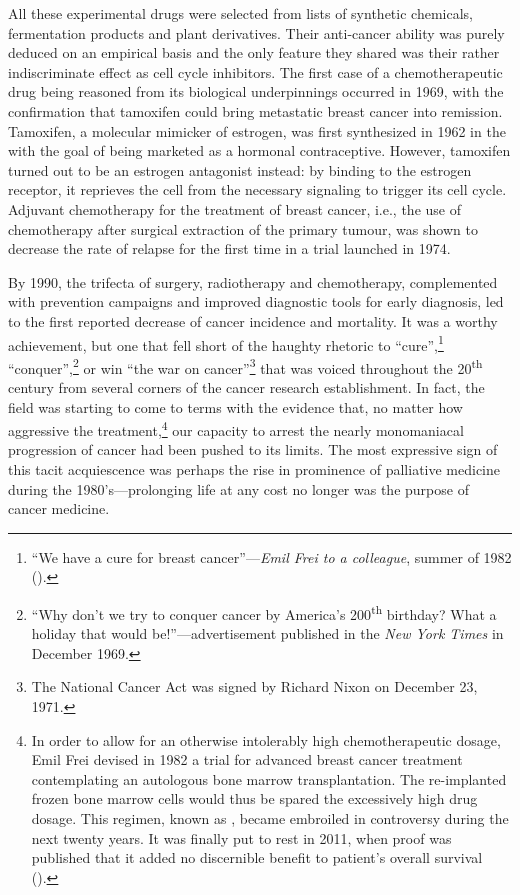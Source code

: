 All these experimental drugs were selected from lists of synthetic chemicals,
fermentation products and plant derivatives.  Their anti-cancer ability was
purely deduced on an empirical basis and the only feature they shared was their
rather indiscriminate effect as cell cycle inhibitors.  The first case of a
chemotherapeutic drug being reasoned from its biological underpinnings occurred
in 1969, with the confirmation that tamoxifen could bring metastatic breast
cancer into remission.\cite{cole_new_1971} Tamoxifen, a molecular mimicker of
estrogen, was first synthesized in 1962 in the  with the goal of
being marketed as a hormonal contraceptive.  However, tamoxifen turned out to be
an estrogen antagonist instead: by binding to the estrogen receptor, it
reprieves the cell from the necessary signaling to trigger its cell
cycle.\cite{jordan_effects_1977} Adjuvant chemotherapy for the treatment of
breast cancer, i.e., the use of chemotherapy after surgical extraction of the
primary tumour, was shown to decrease the rate of relapse for the first time in
a trial launched in 1974.\cite{bonadonna_combination_1976}

By 1990, the trifecta of surgery, radiotherapy and chemotherapy, complemented
with prevention campaigns and improved diagnostic tools for early diagnosis, led
to the first reported decrease of cancer incidence and
mortality.\cite{devita_two_2012} It was a worthy achievement, but one that fell
short of the haughty rhetoric to ``cure'',\footnote{``We have a cure for breast
  cancer''---\emph{Emil Frei to a colleague}, summer of 1982
  (\citealp{mukherjee_emperor_2011}).} ``conquer'',\footnote{``Why don't we try
  to conquer cancer by America's 200\textsuperscript{th} birthday? What a
  holiday that would be!''---advertisement published in the \emph{New York
    Times} in December 1969.} or win ``the war on cancer''\footnote{The National
  Cancer Act was signed by Richard Nixon on December 23, 1971.} that was voiced
throughout the 20\textsuperscript{th} century from several corners of the cancer
research establishment.  In fact, the field was starting to come to terms with
the evidence that, no matter how aggressive the treatment,\footnote{In order to
  allow for an otherwise intolerably high chemotherapeutic dosage, Emil Frei
  devised in 1982 a trial for advanced breast cancer treatment contemplating an
  autologous bone marrow transplantation.  The re-implanted frozen bone marrow
  cells would thus be spared the excessively high drug dosage.  This regimen,
  known as , became embroiled in controversy during the next
  twenty years.  It was finally put to rest in 2011, when proof was published
  that it added no discernible benefit to patient's overall survival
  (\citealp{berry_high-dose_2011}).} our capacity to arrest the nearly
monomaniacal progression of cancer had been pushed to its limits.  The most
expressive sign of this tacit acquiescence was perhaps the rise in prominence of
palliative medicine during the 1980's---prolonging life at any cost no longer
was the purpose of cancer medicine.

